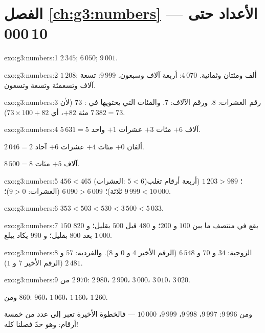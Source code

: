 \section*{الفصل \ref{ch:g3:numbers} --- الأعداد حتى 10\,000}

\begin{solution}{exo:g3:numbers:1}
$2\,345$; \quad $6\,050$; \quad $9\,001$.
\end{solution}

\begin{solution}{exo:g3:numbers:2}
$1\,208$: ألف ومئتان وثمانية. \quad
$4\,070$: أربعة آلاف وسبعون. \quad
$9\,999$: تسعة آلاف وتسعمئة وتسعة وتسعون.
\end{solution}

\begin{solution}{exo:g3:numbers:3}
رقم العشرات: $8$. ورقم الآلاف: $7$. والمئات التي يحتويها في
: $73$ (لأن $7\,382 = 73$ مئة $+ 82$، أي
$73 \times 100 + 82$).
\end{solution}

\begin{solution}{exo:g3:numbers:4}
$5\,631 = 5$ آلاف $+ 6$ مئات $+ 3$ عشرات $+ 1$ واحد.

$2\,046 = 2$ ألفان $+ 0$ مئات $+ 4$ عشرات $+ 6$ آحاد.

$8\,500 = 8$ آلاف $+ 5$ مئات.
\end{solution}

\begin{solution}{exo:g3:numbers:5}
$456 < 465$ (العشرات: $5 < 6$)؛ \quad
$1\,203 > 989$ (أربعة أرقام تغلب ثلاثة)؛ \quad
$6\,090 > 6\,009$ (العشرات: $9 > 0$)؛ \quad
$9\,999 < 10\,000$.
\end{solution}

\begin{solution}{exo:g3:numbers:6}
$353 < 503 < 530 < 3\,500 < 5\,033$.
\end{solution}

\begin{solution}{exo:g3:numbers:7}
$150$ يقع في منتصف ما بين $100$ و $200$؛ و $480$ قبل
$500$ بقليل؛ و $820$ بعد $800$ بقليل؛ و $990$ يكاد يبلغ $1\,000$.
\end{solution}

\begin{solution}{exo:g3:numbers:8}
الزوجية: $34$ و $70$ و $6\,548$ (الرقم الأخير $4$ و $0$ و $8$).
والفردية: $57$ و $2\,481$ (الرقم الأخير $7$ و $1$).
\end{solution}

\begin{solution}{exo:g3:numbers:9}
من $2\,970$: $2\,980$، $2\,990$، $3\,000$، $3\,010$، $3\,020$.

ومن $860$: $960$، $1\,060$، $1\,160$، $1\,260$.

ومن $9\,996$: $9\,997$، $9\,998$، $9\,999$، $10\,000$ --- فالخطوة
الأخيرة تعبر إلى عدد من خمسة أرقام: وهو حدّ فصلنا كله!
\end{solution}

